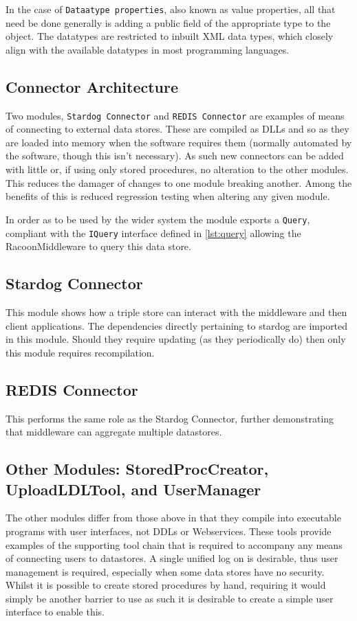 In the case of \texttt{Dataatype properties}, also known as value properties, all that need be done generally is adding a public field of the appropriate type to the object. The datatypes are restricted to inbuilt XML data types, which closely align with the available datatypes in most programming languages. 

\subsection{Connector Architecture}
Two modules, \texttt{Stardog Connector} and \texttt{REDIS Connector} are examples of means of connecting to external data stores. These are compiled as DLLs and so as they are loaded into memory when the software requires them (normally automated by the software, though this isn't necessary). As such new connectors can be added with little or, if using only stored procedures, no alteration to the other modules. This reduces the damager of changes to one module breaking another. Among the benefits of this is reduced regression testing when altering any given module. 

In order as to be used by the wider system the module exports a \texttt{Query}, compliant with the \texttt{IQuery} interface defined in \autoref{lst:query} allowing the RacoonMiddleware to query this data store.

\subsection{Stardog Connector}

This module shows how a triple store can interact with the middleware and then client applications. The dependencies directly pertaining to stardog are imported in this module. Should they require updating (as they periodically do) then only this module requires recompilation.

\subsection{REDIS Connector}

This performs the same role as the Stardog Connector, further demonstrating that middleware can aggregate multiple datastores.


\subsection{Other Modules: StoredProcCreator, UploadLDLTool, and UserManager}
The other modules differ from those above in that they compile into executable programs with user interfaces, not DDLs or Webservices. These tools provide examples of the supporting tool chain that is required to accompany any means of connecting users to datastores. A single unified log on is desirable, thus user management is required, especially when some data stores have no security. Whilst it is possible to create stored procedures by hand, requiring it would simply be another barrier to use as such it is desirable to create a simple user interface to enable this. 


